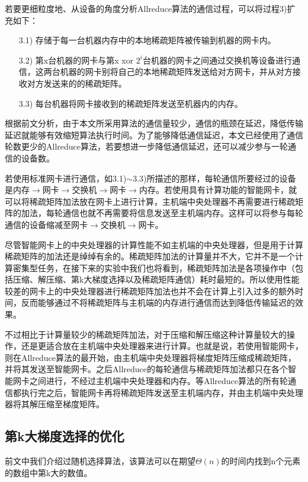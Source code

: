 若要更细粒度地、从设备的角度分析Allreduce算法的通信过程，可以将过程3)扩充如下：
\begin{itemize}
  \item [3.1)]
  存储于每一台机器内存中的本地稀疏矩阵被传输到机器的网卡内。
  \item [3.2)]
  第x台机器的网卡与第x xor $2^i$台机器的网卡之间通过交换机等设备进行通信，这两台机器的网卡别将自己的本地稀疏矩阵发送给对方网卡，并从对方接收对方发送来的的稀疏矩阵。
  \item [3.3)]
  每台机器将网卡接收到的稀疏矩阵发送至机器内的内存。
\end{itemize}

根据前文分析，由于本文所采用算法的通信量较少，通信的瓶颈在延迟，降低传输延迟就能够有效缩短算法执行时间。为了能够降低通信延迟，本文已经使用了通信轮数更少的Allreduce算法，若要想进一步降低通信延迟，还可以减少参与一轮通信的设备数。

若使用标准网卡进行通信，如3.1)$\sim$3.3)所描述的那样，每轮通信所要经过的设备是内存$\rightarrow$网卡$\rightarrow$交换机$\rightarrow$网卡$\rightarrow$内存。若使用具有计算功能的智能网卡，就可以将稀疏矩阵加法放在网卡上进行计算，主机端中央处理器不再需要进行稀疏矩阵的加法，每轮通信也就不再需要将信息发送至主机端内存。这样可以将参与每轮通信的设备缩减至网卡$\rightarrow$交换机$\rightarrow$网卡。

尽管智能网卡上的中央处理器的计算性能不如主机端的中央处理器，但是用于计算稀疏矩阵的加法还是绰绰有余的。稀疏矩阵加法的计算量并不大，它并不是一个计算密集型任务，在接下来的实验中我们也将看到，稀疏矩阵加法是各项操作中（包括压缩、解压缩、第k大梯度选择以及稀疏矩阵通信）耗时最短的。所以使用性能较差的网卡上的中央处理器进行稀疏矩阵加法也并不会在计算上引入过多的额外时间，反而能够通过不将稀疏矩阵与主机端的内存进行通信而达到降低传输延迟的效果。

不过相比于计算量较少的稀疏矩阵加法，对于压缩和解压缩这种计算量较大的操作，还是更适合放在主机端中央处理器来进行计算。也就是说，若使用智能网卡，则在Allreduce算法的最开始，由主机端中央处理器将梯度矩阵压缩成稀疏矩阵，并将其发送至智能网卡。之后Allreduce的每轮通信与稀疏矩阵加法都只在各个智能网卡之间进行，不经过主机端中央处理器和内存。等Allreduce算法的所有轮通信都执行完之后，智能网卡再将稀疏矩阵发送至主机端内存，并由主机端中央处理器将其解压缩至梯度矩阵。

\subsection{第k大梯度选择的优化}
\label{subsec:topKOptimize}
前文中我们介绍过随机选择算法，该算法可以在期望$\Theta(n)$的时间内找到n个元素的数组中第k大的数值。

